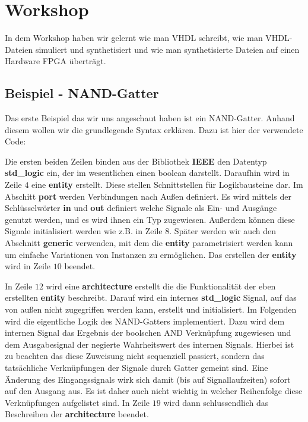 \section{Workshop}
In dem Workshop haben wir gelernt wie man VHDL schreibt, wie man VHDL-Dateien simuliert und synthetisiert und wie man synthetisierte Dateien auf einen Hardware FPGA überträgt.

\subsection{Beispiel - NAND-Gatter}
Das erste Beispiel das wir uns angeschaut haben ist ein NAND-Gatter.
Anhand diesem wollen wir die grundlegende Syntax erklären.
Dazu ist hier der verwendete Code:



Die ersten beiden Zeilen binden aus der Bibliothek \textbf{IEEE} den Datentyp \textbf{std\_logic} ein, der im wesentlichen einen boolean darstellt.
Daraufhin wird in Zeile $4$ eine \textbf{entity} erstellt.
Diese stellen Schnittstellen für Logikbausteine dar.
Im Abschitt \textbf{port} werden Verbindungen nach Außen definiert.
Es wird mittels der Schlüsselwörter \textbf{in} und \textbf{out} definiert welche Signale als Ein- und Ausgänge genutzt werden, und es wird ihnen ein Typ zugewiesen.
Außerdem können diese Signale initialisiert werden wie z.B. in Zeile $8$.
Später werden wir auch den Abschnitt \textbf{generic} verwenden, mit dem die \textbf{entity} parametrisiert werden kann um einfache Variationen von Instanzen zu ermöglichen.
Das erstellen der \textbf{entity} wird in Zeile $10$ beendet.

In Zeile $12$ wird eine \textbf{architecture} erstellt die die Funktionalität der eben erstellten \textbf{entity} beschreibt.
Darauf wird ein internes \textbf{std\_logic} Signal, auf das von außen nicht zugegriffen werden kann, erstellt und initialisiert.
Im Folgenden wird die eigentliche Logik des NAND-Gatters implementiert.
Dazu wird dem internen Signal das Ergebnis der boolschen AND Verknüpfung zugewiesen und dem Ausgabesignal der negierte Wahrheitswert des internen Signals.
Hierbei ist zu beachten das diese Zuweisung nicht sequenziell passiert, sondern das tatsächliche Verknüpfungen der Signale durch Gatter gemeint sind.
Eine Änderung des Eingangssignals wirk sich damit (bis auf Signallaufzeiten) sofort auf den Ausgang aus.
Es ist daher auch nicht wichtig in welcher Reihenfolge diese Verknüpfungen aufgelistet sind.
In Zeile $19$ wird dann schlussendlich das Beschreiben der \textbf{architecture} beendet.

